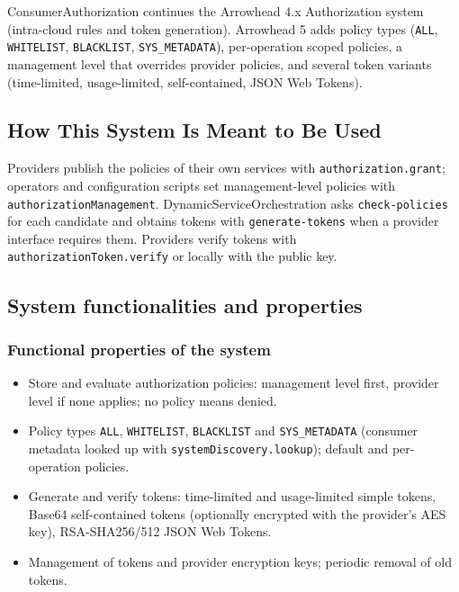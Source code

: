 \documentclass[a4paper]{arrowhead}
\begin{document}
Consumer\allowbreak{}Authorization continues the Arrowhead 4.x Authorization system (intra-cloud rules and token generation). Arrowhead 5 adds policy types (\texttt{ALL}, \texttt{WHITELIST}, \texttt{BLACKLIST}, \texttt{SYS\_\allowbreak{}METADATA}), per-operation scoped policies, a management level that overrides provider policies, and several token variants (time-limited, usage-limited, self-contained, JSON Web Tokens).

\subsection{How This System Is Meant to Be Used}
\label{sec:use}

Providers publish the policies of their own services with \texttt{authorization.\allowbreak{}grant}; operators and configuration scripts set management-level policies with \texttt{authorization\allowbreak{}Management}. Dynamic\allowbreak{}Service\allowbreak{}Orchestration asks \texttt{check-\allowbreak{}policies} for each candidate and obtains tokens with \texttt{generate-\allowbreak{}tokens} when a provider interface requires them. Providers verify tokens with \texttt{authorization\allowbreak{}Token.\allowbreak{}verify} or locally with the public key.

\subsection{System functionalities and properties}
\label{sec:properties}

\subsubsection{Functional properties of the system}

\begin{itemize}
  \item Store and evaluate authorization policies: management level first, provider level if none applies; no policy means denied.
  \item Policy types \texttt{ALL}, \texttt{WHITELIST}, \texttt{BLACKLIST} and \texttt{SYS\_\allowbreak{}METADATA} (consumer metadata looked up with \texttt{system\allowbreak{}Discovery.\allowbreak{}lookup}); default and per-operation policies.
  \item Generate and verify tokens: time-limited and usage-limited simple tokens, Base64 self-contained tokens (optionally encrypted with the provider's AES key), RSA-SHA256/512 JSON Web Tokens.
  \item Management of tokens and provider encryption keys; periodic removal of old tokens.
\end{itemize}
\end{document}
